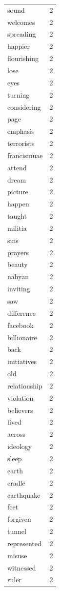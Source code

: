 \begin{tabular}{lr}
sound & 2 \\
welcomes & 2 \\
spreading & 2 \\
happier & 2 \\
flourishing & 2 \\
lose & 2 \\
eyes & 2 \\
turning & 2 \\
considering & 2 \\
page & 2 \\
emphasis & 2 \\
terrorists & 2 \\
francisinuae & 2 \\
attend & 2 \\
dream & 2 \\
picture & 2 \\
happen & 2 \\
taught & 2 \\
militia & 2 \\
sins & 2 \\
prayers & 2 \\
beauty & 2 \\
nahyan & 2 \\
inviting & 2 \\
saw & 2 \\
difference & 2 \\
facebook & 2 \\
billionaire & 2 \\
back & 2 \\
initiatives & 2 \\
old & 2 \\
relationship & 2 \\
violation & 2 \\
believers & 2 \\
lived & 2 \\
across & 2 \\
ideology & 2 \\
sleep & 2 \\
earth & 2 \\
cradle & 2 \\
earthquake & 2 \\
feet & 2 \\
forgiven & 2 \\
tunnel & 2 \\
represented & 2 \\
misuse & 2 \\
witnessed & 2 \\
ruler & 2 \\

\end{tabular}

